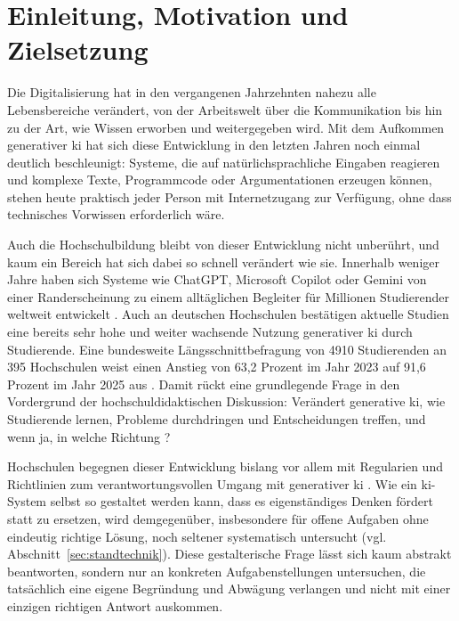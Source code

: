 \chapter{Einleitung, Motivation und Zielsetzung}
\label{chap:einleitung}

Die Digitalisierung hat in den vergangenen Jahrzehnten nahezu alle Lebensbereiche verändert, von der
Arbeitswelt über die Kommunikation bis hin zu der Art, wie Wissen erworben und weitergegeben wird. Mit
dem Aufkommen generativer \gls{ki} hat sich diese Entwicklung in den letzten Jahren noch einmal
deutlich beschleunigt: Systeme, die auf natürlichsprachliche Eingaben reagieren und komplexe Texte,
Programmcode oder Argumentationen erzeugen können, stehen heute praktisch jeder Person mit
Internetzugang zur Verfügung, ohne dass technisches Vorwissen erforderlich wäre.

Auch die Hochschulbildung bleibt von dieser Entwicklung nicht unberührt, und kaum ein Bereich hat sich
dabei so schnell verändert wie sie. Innerhalb weniger Jahre haben sich Systeme wie ChatGPT, Microsoft
Copilot oder Gemini von einer Randerscheinung zu einem alltäglichen Begleiter für Millionen
Studierender weltweit entwickelt \cite{kasneciChatGPTGoodOpportunities2023, labadzeRoleAIChatbots2023}.
Auch an deutschen Hochschulen bestätigen aktuelle Studien eine bereits sehr hohe und weiter wachsende
Nutzung generativer \acrshort{ki} durch Studierende. Eine bundesweite Längsschnittbefragung von 4910
Studierenden an 395 Hochschulen weist einen Anstieg von 63,2 Prozent im Jahr 2023 auf 91,6 Prozent im
Jahr 2025 aus \cite{vongarrelKuenstlicheIntelligenzStudium2025,
marczukKuenstlicheIntelligenzStudienalltag2025}. Damit rückt eine grundlegende Frage in den Vordergrund der hochschuldidaktischen
Diskussion: Verändert generative \acrshort{ki}, wie Studierende lernen, Probleme durchdringen und
Entscheidungen treffen, und wenn ja, in welche Richtung \cite{limGenerativeAIFuture2023}?

Hochschulen begegnen dieser Entwicklung bislang vor allem mit Regularien und Richtlinien zum
verantwortungsvollen Umgang mit generativer \acrshort{ki}
\cite{chanComprehensiveAIPolicy2023, hallGenerativeAIReweaving2024}. Wie ein \acrshort{ki}-System
selbst so gestaltet werden kann, dass es eigenständiges Denken fördert statt zu ersetzen, wird
demgegenüber, insbesondere für offene Aufgaben ohne eindeutig richtige Lösung, noch seltener
systematisch untersucht (vgl. Abschnitt~\ref{sec:standtechnik}). Diese gestalterische Frage lässt sich kaum
abstrakt beantworten, sondern nur an konkreten Aufgabenstellungen untersuchen, die tatsächlich eine
eigene Begründung und Abwägung verlangen und nicht mit einer einzigen richtigen Antwort auskommen.

